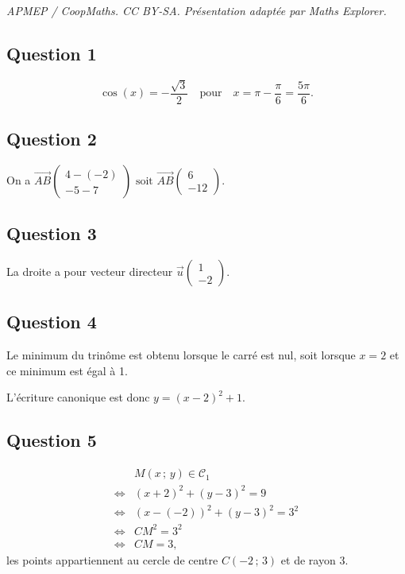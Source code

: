 \documentclass[10pt]{article}
\begin{document}
\noindent\textit{APMEP / CoopMaths. CC BY-SA. Présentation adaptée par Maths Explorer.}\par\medskip
\subsection*{Question 1}

\[
\cos(x) = -\dfrac{\sqrt{3}}{2} \quad \text{pour} \quad x = \pi - \dfrac{\pi}{6} = \dfrac{5\pi}{6}.
\]

\subsection*{Question 2}

On a \(\overrightarrow{AB} \begin{pmatrix} 4 - (-2) \\ -5 - 7 \end{pmatrix} \text{ soit } \overrightarrow{AB} \begin{pmatrix} 6 \\ -12 \end{pmatrix}\).

\subsection*{Question 3}

La droite a pour vecteur directeur \(\overrightarrow{u}\begin{pmatrix} 1 \\ -2 \end{pmatrix}\).

\subsection*{Question 4}

Le minimum du trinôme est obtenu lorsque le carré est nul, soit lorsque \( x = 2 \) et ce minimum est égal à 1.

L'écriture canonique est donc \( y = (x - 2)^2 + 1 \).

\subsection*{Question 5}

\begin{align*}
&M(x\,;\,y) \in \mathcal{C}_1 \\
\iff &(x + 2)^2 + (y - 3)^2 = 9 \\
\iff &(x - (-2))^2 + (y - 3)^2 = 3^2 \\
\iff &CM^2 = 3^2 \\
\iff &CM = 3,
\end{align*}
les points appartiennent au cercle de centre \( C(-2\,;\,3) \) et de rayon 3.
\end{document}
